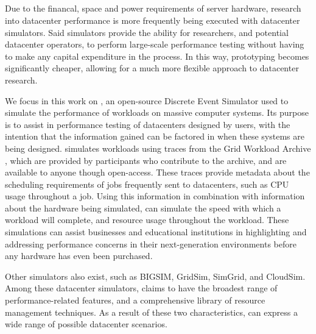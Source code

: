 \documentclass[11pt]{article}
\begin{document}
	\subsection{\opendc{}}
		Due to the financal, space and power requirements of server hardware, research into datacenter performance is more frequently being executed with datacenter simulators.
		Said simulators provide the ability for researchers, and potential datacenter operators, to perform large-scale performance testing without having to make any capital expenditure in the process.
		In this way, prototyping becomes significantly cheaper, allowing for a much more flexible approach to datacenter research.

		We focus in this work on \opendc{}, an open-source Discrete Event Simulator used to simulate the performance of workloads on massive computer systems. 
		Its purpose is to assist in performance testing of datacenters designed by users, with the intention that the information gained can be factored in when these systems are being designed. 
		\opendc{} simulates workloads using traces from the Grid Workload Archive \cite{Iosup2008}, which are provided by participants who contribute to the archive, and are available to anyone though open-access. 
		These traces provide metadata about the scheduling requirements of jobs frequently sent to datacenters, such as CPU usage throughout a job. 
		Using this information in combination with information about the hardware being simulated, \opendc{} can simulate the speed with which a workload will complete, and resource usage throughout the workload. 
		These simulations can assist businesses and educational institutions in highlighting and addressing performance concerns in their next-generation environments before any hardware has even been purchased.

		Other simulators also exist, such as BIGSIM, GridSim, SimGrid, and CloudSim.
		Among these datacenter simulators, \opendc{} claims to have the broadest range of performance-related features, and a comprehensive library of resource management techniques.
		As a result of these two characteristics, \opendc{} can express a wide range of possible datacenter scenarios.
	
\end{document}
